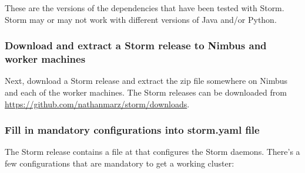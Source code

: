 \documentclass[a4paper, 12pt]{article}
\begin{document}
These are the versions of the dependencies that have been tested with Storm. Storm may or may not work with different versions of Java and/or Python.

\subsubsection{Download and extract a Storm release to Nimbus and worker machines}
Next, download a Storm release and extract the zip file somewhere on Nimbus and each of the worker machines. The Storm releases can be downloaded from \url{https://github.com/nathanmarz/storm/downloads}.

\subsubsection{Fill in mandatory configurations into storm.yaml file}
The Storm release contains a file at  that configures the Storm daemons. There's a few configurations that are mandatory to get a working cluster:
\end{document}
